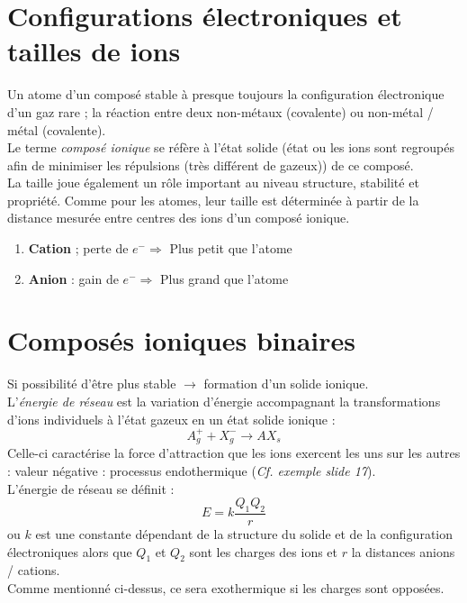 \documentclass	[11pt, a4paper, openany]{book}
\begin{document}
\section{Configurations électroniques et tailles de ions}
Un atome d'un composé stable à presque toujours la configuration électronique d'un gaz rare ; la réaction entre deux non-métaux (covalente) ou non-métal / métal (covalente).\\

Le terme \textit{composé ionique} se réfère à l'état solide (état ou les ions sont regroupés afin de minimiser les répulsions (très différent de gazeux)) de ce composé.\\

La taille joue également un rôle important au niveau structure, stabilité et propriété. Comme pour les atomes, leur taille est déterminée à partir de la distance mesurée entre centres des ions d'un composé ionique.

\begin{enumerate}
	\item \textbf{Cation} ; perte de $e^- \Rightarrow$ Plus petit que l'atome
	\item \textbf{Anion} : gain de $e^- \Rightarrow$ Plus grand que l'atome
\end{enumerate}

\section{Composés ioniques binaires}
Si possibilité d'être plus stable $\rightarrow$ formation d'un solide ionique.\\
L'\textit{énergie de réseau} est la variation d'énergie accompagnant la transformations d'ions individuels à l'état gazeux en un état solide ionique : 
$$A^+_g + X^-_g \rightarrow AX_s$$
Celle-ci caractérise la force d'attraction que les ions exercent les uns sur les autres : valeur négative : processus endothermique (\textit{Cf. exemple slide 17}).\\
L'énergie de réseau se définit : 
$$E = k \frac{Q_1 Q_2}{r}$$
ou $k$ est une constante dépendant de la structure du solide et de la configuration électroniques alors que $Q_1$ et $Q_2$ sont les charges des ions et $r$ la distances anions / cations.\\
Comme mentionné ci-dessus, ce sera exothermique si les charges sont opposées.
\end{document}
